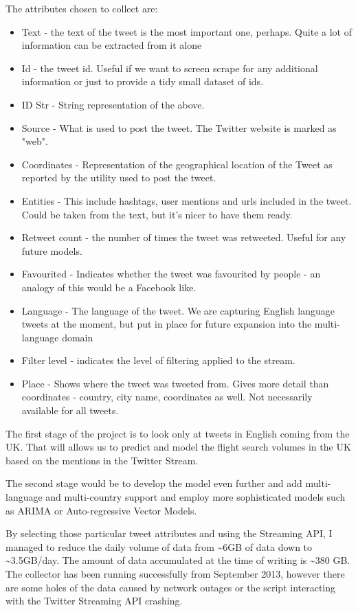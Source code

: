 \documentclass[minf,frontabs,twoside,singlespacing,parskip]{infthesis}
\begin{document}
The attributes chosen to collect are:
\begin{itemize}
\item Text - the text of the tweet is the most important one, perhaps. Quite a lot of information can be extracted from it alone
\item Id - the tweet id. Useful if we want to screen scrape for any additional information or just to provide a tidy small dataset of ids.
\item ID Str - String representation of the above.
\item Source - What is used to post the tweet. The Twitter website is marked as "web".
\item Coordinates  - Representation of the geographical location of the Tweet as reported by the utility used to post the tweet.
\item Entities - This include hashtags, user mentions and urls included in the tweet. Could be taken from the text, but it's nicer to have them ready.
\item Retweet count - the number of times the tweet was retweeted. Useful for any future models. 
\item Favourited - Indicates whether the tweet was favourited by people - an analogy of this would be a Facebook like. 
\item Language - The language of the tweet. We are capturing English language tweets at the moment, but put in place for future expansion into the multi-language domain
\item Filter level - indicates the level of filtering applied to the stream.
\item Place - Shows where the tweet was tweeted from. Gives more detail than coordinates - country, city name, coordinates as well. Not necessarily available for all tweets.
\end{itemize}

The first stage of the project is to look only at tweets in English coming from the UK. That will allows us to predict and model the flight search volumes in the UK based on the mentions in the Twitter Stream.

The second stage would be to develop the model even further and add multi-language and multi-country support and employ more sophisticated models such as ARIMA or Auto-regressive Vector Models.

By selecting those particular tweet attributes and using the Streaming API, I managed to reduce the daily volume of data from \textasciitilde 6GB of data down to \textasciitilde 3.5GB/day.
The amount of data accumulated at the time of writing is \textasciitilde 380 GB. The collector has been running successfully from September 2013, however there are some holes of the data caused by network outages or the script interacting with the Twitter Streaming API crashing. 
\end{document}
